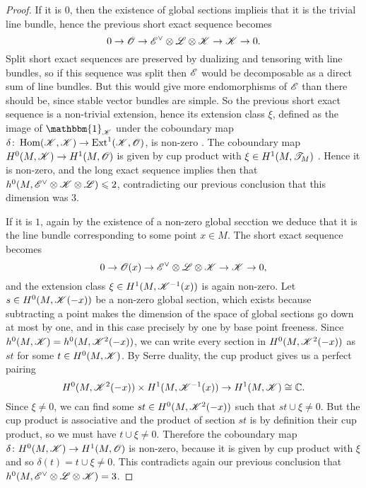 \documentclass[A4paper, 12pt, british, reqno]{amsart}
\DeclareMathOperator{\Hom}{Hom}
\DeclareMathOperator{\Ext}{Ext}
\newcommand{\ot}{\otimes}
\newcommand{\dual}{^{\vee}}
\newcommand{\1}{\mathbbm{1}}
\begin{document}
\begin{lm}
\begin{proof}
	If it is $0$, then the existence of global sections implieis that it is the trivial line bundle, hence the previous short exact sequence becomes
	\[ 0\to \O\to \E\dual\ot\L\ot\sK\to \sK\to 0. \]
	Split short exact sequences are preserved by dualizing and tensoring with line bundles, so if this sequence was split then $\mathscr{E}$ would be decomposable as a direct sum of line bundles.
	But this would give more endomorphisms of $\mathscr{E}$ than there should be, since stable vector bundles are simple.
	So the previous short exact sequence is a non-trivial extension, hence its extension class $\xi$, defined as the image of $\1_{\sK}$ under the coboundary map $\delta\colon \Hom(\sK,\sK)\to \Ext^{1}(\sK,\O)$, is non-zero \cite[Exercise III.6.1]{har77}.
	The coboundary map $H^{0}(M,\mathscr{K})\to H^{1}(M,\mathscr{O})$ is given by cup product with $\xi\in H^{1}(M,\mathscr{T}_{M})$ \cite[Theorem II.7.1]{bre97}.
	Hence it is non-zero, and the long exact sequence implies then that $h^{0}(M,\E\dual\ot \sK\ot\L)\leqslant 2$, contradicting our previous conclusion that this dimension was $3$.

	If it is $1$, again by the existence of a non-zero global secction we deduce that it is the line bundle corresponding to some point $x\in M$.
	The short exact sequence becomes
	\[ 0\to \O(x)\to \E\dual\ot\L\ot\sK\to \sK\to 0, \]
	and the extension class $\xi\in H^{1}(M,\mathscr{K}^{-1}(x))$ is again non-zero.
	Let $s\in H^{0}(M,\mathscr{K}(-x))$ be a non-zero global section, which exists because subtracting a point makes the dimension of the space of global sections go down at most by one, and in this case precisely by one by base point freeness.
	Since $h^{0}(M,\mathscr{K})=h^{0}(M,\mathscr{K}^{2}(-x))$, we can write every section in $H^{0}(M,\mathscr{K}^{2}(-x))$ as $st$ for some $t\in H^{0}(M,\mathscr{K})$.
	By Serre duality, the cup product gives us a perfect pairing
	\[ H^{0}(M,\mathscr{K}^{2}(-x))\times H^{1}(M,\mathscr{K}^{-1}(x))\to H^{1}(M,\mathscr{K})\cong \mathbb{C}. \]
	Since $\xi\neq 0$, we can find some $st\in H^{0}(M,\mathscr{K}^{2}(-x))$ such that $st\cup \xi\neq 0$.
	But the cup product is associative \cite[Proposition II.7.3]{bre97} and the product of section $st$ is by definition their cup product, so we must have $t\cup \xi\neq 0$.
	Therefore the coboundary map $\delta\colon H^{0}(M,\mathscr{K})\to H^{1}(M,\mathscr{O})$ is non-zero, because it is given by cup product with $\xi$ \cite[Theorem II.7.1]{bre97} and so $\delta(t)=t\cup \xi \neq 0$.
	This contradicts again our previous conclusion that $h^{0}(M,\E\dual\ot \L\ot \sK)=3$.
    \end{proof}
\end{lm}
\end{document}
